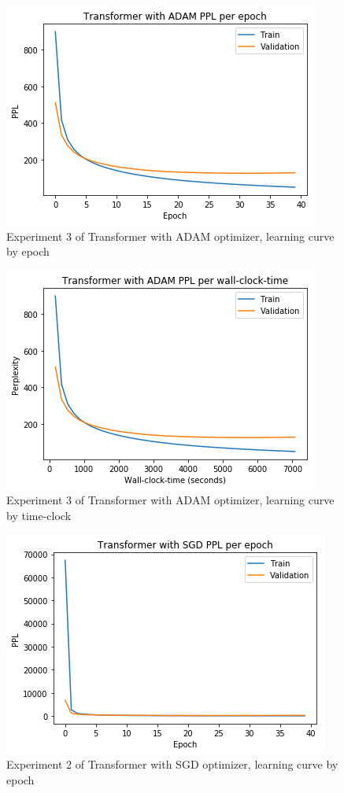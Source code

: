 \begin{itemize}
\begin{figure}[H]
	\centering
	\includegraphics[scale=0.8]{Q4-2_TR_ADAM_epoch.png}
	\caption{Experiment 3 of Transformer with ADAM optimizer, learning curve by epoch}
	\label{fig:fig15}
\end{figure}

\begin{figure}[H]
	\centering
	\includegraphics[scale=0.8]{Q4-2_TR_ADAM_clock.png}
	\caption{Experiment 3 of Transformer with ADAM optimizer, learning curve by time-clock}
	\label{fig:fig16}
\end{figure}

\begin{figure}[H]
	\centering
	\includegraphics[scale=0.8]{Q4-2_TR_SGD_epoch.png}
	\caption{Experiment 2 of Transformer with SGD optimizer, learning curve by epoch}
	\label{fig:fig17}
\end{figure}


\end{itemize}
